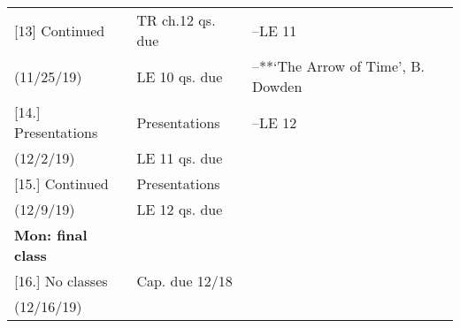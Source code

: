 \documentclass[article,oneside]{memoir}
\begin{document}
\begin{center}
\begin{longtable}{p{4.5cm}p{2.5cm}p{5cm}}
[13] Continued			 	& TR ch.12 qs. due	& --LE 11\\
(11/25/19)					&  LE 10 qs. due	 &--**`The Arrow of Time', B. Dowden \\ [1.8\baselineskip]




				


[14.] Presentations 		& Presentations 			&    --LE 12 \\
(12/2/19)				       &   LE 11 qs. due	   	&  \\ [1.8\baselineskip]

						
[15.] 	Continued     			& 		Presentations	&   \\
(12/9/19)				      	& 	LE 12 qs. due		 &  \\ 
\textbf{Mon: final class}		&			&  \\ [1.8\baselineskip]

[16.] 	No classes	 	      		&  Cap. due 12/18				&   \\
(12/16/19)				      	&			      	&  \\  [1.8\baselineskip]



\end{longtable}
\end{center}





\end{document}

